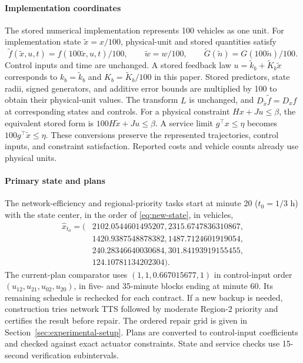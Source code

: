 \documentclass[preprint,12pt]{elsarticle}
\theoremstyle{definition}
\theoremstyle{plain}
\theoremstyle{definition}
\theoremstyle{plain}
\begin{document}
\paragraph{Implementation coordinates}
The stored numerical implementation represents 100 vehicles as one unit.
For implementation state $\widetilde x=x/100$, physical-unit and stored
quantities satisfy
\[
\widetilde f(\widetilde x,u,t)=f(100\widetilde x,u,t)/100,\qquad
\widetilde w=w/100,\qquad
\widetilde G(\widetilde n)=G(100\widetilde n)/100.
\]
Control inputs and time are unchanged. A stored feedback law
$u=\widetilde k_b+\widetilde K_b\widetilde x$ corresponds to
$k_b=\widetilde k_b$ and $K_b=\widetilde K_b/100$ in this paper.
Stored predictors, state radii, signed generators, and additive error
bounds are multiplied by 100 to obtain their physical-unit values.
The transform $L$ is unchanged, and
$D_{\widetilde x}\widetilde f=D_x f$ at corresponding states and controls.
For a physical constraint $Hx+Ju\le\beta$, the equivalent stored form is
$100H\widetilde x+Ju\le\beta$.
A service limit $g^\top x\le\eta$ becomes
$100g^\top\widetilde x\le\eta$.
These conversions preserve the represented trajectories, control inputs,
and constraint satisfaction. Reported costs and vehicle counts already
use physical units.

\paragraph{Primary state and plans}
The network-efficiency and regional-priority tasks start at minute 20 ($t_0=1/3$ h) with the state center, in the order of
\eqref{eq:new-state}, in vehicles,
\[
\begin{aligned}
\widehat x_{t_0}=(&2102.0544601495207,2315.6747836310867,\\
&1420.9387548878382,1487.7124601919054,\\
&240.28346640030684,301.84193919155455,\\
&124.10781134202304).
\end{aligned}
\]
The current-plan comparator uses $(1,1,0.667015677,1)$ in control-input order
$(u_{12},u_{21},u_{02},u_{20})$, in five- and
35-minute blocks ending at minute 60. Its remaining schedule is rechecked for
each contract. If a new backup is needed, construction tries network TTS
followed by moderate Region-2 priority and certifies the result before
repair. The ordered repair grid is given in Section~\ref{sec:experimental-setup}.
Plans are converted to control-input coefficients and checked against exact
actuator constraints. State and service checks use 15-second verification subintervals.
\end{document}
